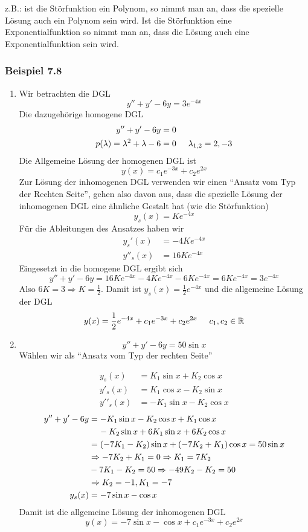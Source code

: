 \noindent z.B.: ist die Störfunktion ein Polynom, so nimmt man an, dass die spezielle Lösung auch ein Polynom sein wird. Ist die Störfunktion eine Exponentialfunktion so nimmt man an, dass die Lösung auch eine Exponentialfunktion sein wird.

\subsubsection*{Beispiel 7.8}
\begin{enumerate}
\item Wir betrachten die DGL \[y''+y'-6y=3e^{-4x}\]
Die dazugehörige homogene DGL 
\begin{align*}
y''+y'-6y&=0\\
p(\lambda)=\lambda^2+\lambda-6&=0\text{\hspace{5mm}}\lambda_{1,2}=2,-3
\end{align*}
Die Allgemeine Lösung der homogenen DGL ist \[y(x)=c_1e^{-3x}+c_2e^{2x}\] Zur Lösung der inhomogenen DGL verwenden wir einen ``Ansatz vom Typ der Rechten Seite'', gehen also davon aus, dass die spezielle Lösung der inhomogenen DGL eine ähnliche Gestalt hat (wie die Störfunktion)
 \[y_s(x)=Ke^{-4x}\]
Für die Ableitungen des Ansatzes haben wir 
\begin{align*}
y_s'(x)&=-4Ke^{-4x}\\
y''_s(x)&=16Ke^{-4x}
\end{align*}
Eingesetzt in die homogene DGL ergibt sich \[y''+y'-6y=16Ke^{-4x}-4Ke^{-4x}-6Ke^{-4x}=6Ke^{-4x}=3e^{-4x}\]Also $6K=3\Rightarrow K=\frac{1}{2}$. Damit ist $y_s(x)=\frac{1}{2}e^{-4x}$ und die allgemeine Lösung der DGL \[y(x)=\frac{1}{2}e^{-4x}+c_1e^{-3x}+c_2e^{2x}\text{\hspace{5mm}}c_1,c_2\in\mathbb{R}\]
\item \[y''+y'-6y=50\sin x\] Wählen wir als ``Ansatz vom Typ der rechten Seite''

\begin{align*}
{y_s}(x) &= {K_1}\sin x + {K_2}\cos x\\
y{'_s}(x) &= {K_1}\cos x - {K_2}\sin x\\
y'{'_s}(x) &=  - {K_1}\sin x - {K_2}\cos x
\end{align*}
\begin{align*}
y'' + y' - 6y &=  - {K_1}\sin x - {K_2}\cos x + {K_1}\cos x\\
 &\hspace{4mm}- {K_2}\sin x + 6{K_1}\sin x + 6{K_2}\cos x\\
 &= ( - 7{K_1} - {K_2})\sin x + ( - 7{K_2} + {K_1})\cos x = 50\sin x\\
 &\Rightarrow  - 7{K_2} + {K_1} = 0 \Rightarrow {K_1} = 7{K_2}\\
& - 7{K_1} - {K_2} = 50 \Rightarrow  - 49{K_2} - {K_2} = 50\\
 &\Rightarrow {K_2} =  - 1,{K_1} =  - 7\\
y_s(x)&=-7\sin x-\cos x
\end{align*}
Damit ist die allgemeine Lösung der inhomogenen DGL \[y(x)=-7\sin x-\cos x+c_1e^{-3x}+c_2e^{2x}\]
\end{enumerate}
